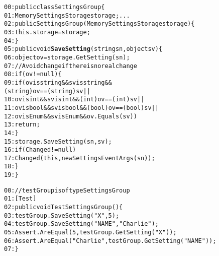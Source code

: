 \begin{figure}[t]
\begin{CodeOut}
\begin{alltt}
00:public class SettingsGroup \{
01:\hspace*{0.1in}MemorySettingsStorage storage; ...
02:\hspace*{0.1in}public SettingsGroup(MemorySettingsStorage storage) \{
03:\hspace*{0.2in}this.storage = storage;
04:\hspace*{0.1in}\}
05:\hspace*{0.1in}public void \textbf{SaveSetting}(string sn, object sv) \{
06:\hspace*{0.2in}object ov = storage.GetSetting( sn );
07:\hspace*{0.2in}//Avoid change if there is no real change
08:\hspace*{0.2in}if (ov != null ) \{
09:\hspace*{0.3in}if (ov is string && sv is string && 
\hspace*{1.0in}(string)ov == (string)sv ||
10:\hspace*{0.4in}ov is int && sv is int && (int)ov == (int)sv ||
11:\hspace*{0.4in}ov is bool && sv is bool && (bool)ov == (bool)sv ||
12:\hspace*{0.4in}ov is Enum && sv is Enum && ov.Equals(sv))
13:\hspace*{0.5in}return;
14:\hspace*{0.2in}\}
15:\hspace*{0.2in}storage.SaveSetting(sn, sv);
16:\hspace*{0.2in}if (Changed != null)
17:\hspace*{0.3in}Changed(this, new SettingsEventArgs(sn));
18:\hspace*{0.1in}\}
19:\}
\end{alltt}
\end{CodeOut}\vspace*{-4ex}
\begin{CodeOut}
\begin{alltt}
00://testGroup is of type SettingsGroup
01:[Test]
02:public void TestSettingsGroup() \{
03:\hspace*{0.1in}testGroup.SaveSetting("X", 5);
04:\hspace*{0.1in}testGroup.SaveSetting("NAME", "Charlie");
05:\hspace*{0.1in}Assert.AreEqual(5, testGroup.GetSetting("X"));
06:\hspace*{0.1in}Assert.AreEqual("Charlie", testGroup.GetSetting("NAME"));
07:\}
\end{alltt}
\end{CodeOut}\vspace*{-4ex}
\vspace*{-2ex}
\end{figure}

